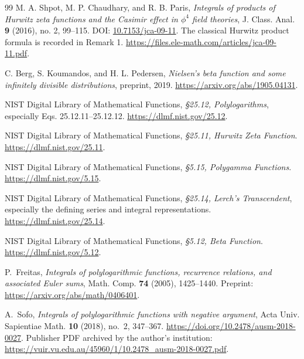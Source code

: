 \begin{thebibliography}{99}
M. A. Shpot, M. P. Chaudhary, and R. B. Paris,
\emph{Integrals of products of Hurwitz zeta functions and the Casimir
 effect in $\phi^4$ field theories},
J. Class. Anal. \textbf{9} (2016), no. 2, 99--115.
DOI: \href{https://doi.org/10.7153/jca-09-11}{10.7153/jca-09-11}.
The classical Hurwitz product formula is recorded in Remark 1.
\url{https://files.ele-math.com/articles/jca-09-11.pdf}.

C. Berg, S. Koumandos, and H. L. Pedersen,
\emph{Nielsen's beta function and some infinitely divisible distributions},
preprint, 2019.
\url{https://arxiv.org/abs/1905.04131}.

NIST Digital Library of Mathematical Functions,
\emph{\S25.12, Polylogarithms}, especially Eqs. 25.12.11--25.12.12.
\url{https://dlmf.nist.gov/25.12}.

NIST Digital Library of Mathematical Functions,
\emph{\S25.11, Hurwitz Zeta Function}.
\url{https://dlmf.nist.gov/25.11}.

NIST Digital Library of Mathematical Functions,
\emph{\S5.15, Polygamma Functions}.
\url{https://dlmf.nist.gov/5.15}.

NIST Digital Library of Mathematical Functions,
\emph{\S25.14, Lerch's Transcendent}, especially the defining series and
integral representations.
\url{https://dlmf.nist.gov/25.14}.

NIST Digital Library of Mathematical Functions,
\emph{\S5.12, Beta Function}.
\url{https://dlmf.nist.gov/5.12}.

P.~Freitas,
\emph{Integrals of polylogarithmic functions, recurrence relations, and
associated Euler sums},
Math. Comp. \textbf{74} (2005), 1425--1440.
Preprint: \url{https://arxiv.org/abs/math/0406401}.

A.~Sofo,
\emph{Integrals of polylogarithmic functions with negative argument},
Acta Univ. Sapientiae Math. \textbf{10} (2018), no.~2, 347--367.
\url{https://doi.org/10.2478/ausm-2018-0027}.
Publisher PDF archived by the author's institution:
\url{https://vuir.vu.edu.au/45960/1/10.2478_ausm-2018-0027.pdf}.

\end{thebibliography}
\endgroup

